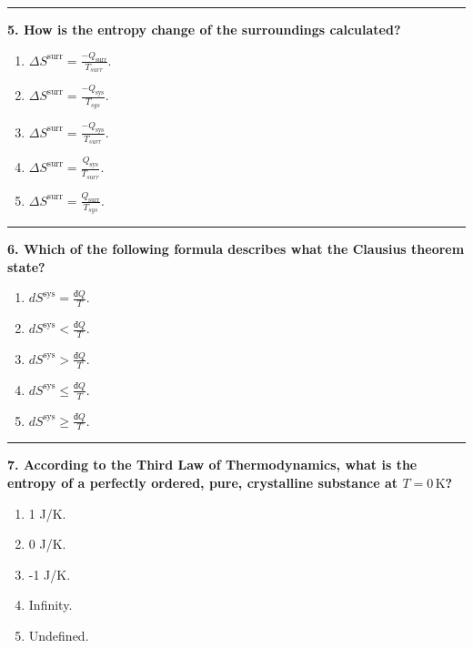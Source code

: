 \documentclass[
  9pt,
]{extbook}
\providecommand{\tightlist}{%
  \setlength{\itemsep}{0pt}\setlength{\parskip}{0pt}}
\theoremstyle{definition}
\theoremstyle{definition}
\theoremstyle{definition}
\theoremstyle{remark}
\begin{document}
\begin{center}\rule{0.5\linewidth}{0.5pt}\end{center}

\textbf{5. How is the entropy change of the surroundings calculated?}

\begin{enumerate}
\def\labelenumi{\alph{enumi}.}
\tightlist
\item
  \(\Delta S^{\text{surr}} = \frac{-Q_{\text{surr}}}{T_{surr}}\).
\item
  \(\Delta S^{\text{surr}} = \frac{-Q_{\text{sys}}}{T_{sys}}\).
\item
  \(\Delta S^{\text{surr}} = \frac{-Q_{\text{sys}}}{T_{surr}}\).
\item
  \(\Delta S^{\text{surr}} = \frac{Q_{\text{sys}}}{T_{surr}}\).
\item
  \(\Delta S^{\text{surr}} = \frac{Q_{\text{surr}}}{T_{sys}}\).
\end{enumerate}

\begin{center}\rule{0.5\linewidth}{0.5pt}\end{center}

\textbf{6. Which of the following formula describes what the Clausius theorem state?}

\begin{enumerate}
\def\labelenumi{\alph{enumi}.}
\tightlist
\item
  \(dS^{\text{sys}} = \frac{đQ}{T}\).
\item
  \(dS^{\text{sys}} < \frac{đQ}{T}\).
\item
  \(dS^{\text{sys}} > \frac{đQ}{T}\).
\item
  \(dS^{\text{sys}} \leq \frac{đQ}{T}\).
\item
  \(dS^{\text{sys}} \geq \frac{đQ}{T}\).
\end{enumerate}

\begin{center}\rule{0.5\linewidth}{0.5pt}\end{center}

\textbf{7. According to the Third Law of Thermodynamics, what is the entropy of a perfectly ordered, pure, crystalline substance at \(T = 0\,\text{K}\)?}

\begin{enumerate}
\def\labelenumi{\alph{enumi}.}
\tightlist
\item
  1 J/K.
\item
  0 J/K.
\item
  -1 J/K.
\item
  Infinity.
\item
  Undefined.
\end{enumerate}
\end{document}
